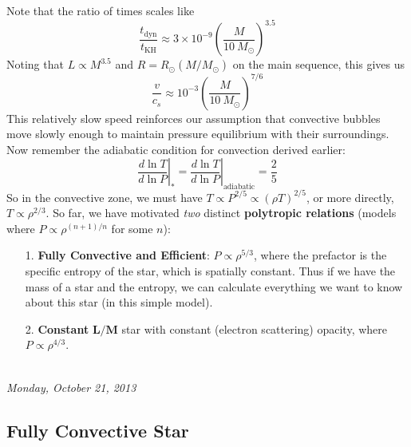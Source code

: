 \documentclass[10pt]{article}
\numberwithin{equation}{section}
\newcommand{\n}{\noindent}
\begin{document}
  \n Note that the ratio of times scales like
  \begin{equation}
    \label{eq:49}
    \frac{t_{\mathrm{dyn}}}{t_{\mathrm{KH}}}\approx 3\times
    10^{-9}\left(\frac{M}{10\ M_\odot}\right)^{3.5}
  \end{equation}
  Noting that $L\propto M^{3.5}$ and $R=R_\odot(M/M_\odot)$ on the
  main sequence, this gives us
  \begin{equation}
    \label{eq:50}
    \frac{v}{c_s}\approx 10^{-3}\left(\frac{M}{10\ M_\odot}\right)^{7/6}
  \end{equation}
  This relatively slow speed reinforces our assumption that convective
  bubbles move slowly enough to maintain pressure equilibrium with their
  surroundings. Now remember the adiabatic condition for convection
  derived earlier:
  \begin{equation}
    \label{eq:51}
    \left.\frac{d\ln T}{d\ln P}\right|_*=\left.\frac{d\ln T}{d\ln P}\right|
_{\mathrm{adiabatic}}=\frac{2}{5}
  \end{equation}
  So in the convective zone, we must have $T\propto P^{2/5}\propto
  (\rho T)^{2/5}$, or more directly, $T\propto \rho^{2/3}$. So far, we
  have motivated \emph{two} distinct \textbf{polytropic relations}
  (models where $P\propto \rho^{(n+1)/n}$ for some $n$):
  \begin{enumerate}
  \item[1.] \textbf{Fully Convective and Efficient}: $P\propto \rho^{5/3}$,
    where the prefactor is the specific entropy of the star, which is
    spatially constant. Thus if we have the mass of a star and the
    entropy, we can calculate everything we want to know about this
    star (in this simple model).
  \item[2.] \textbf{Constant} $\bm{L/M}$ star with constant (electron 
scattering)
    opacity, where $P\propto \rho^{4/3}$.
  \end{enumerate}
\hspace{1in}\\
  \n\textit{Monday, October 21, 2013}

  \subsection{Fully Convective Star}
  \label{sec:fully-conv-star}
\end{document}
